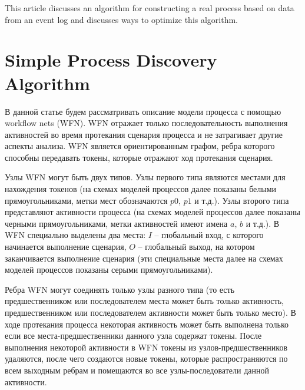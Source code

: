 \documentclass[
11pt,%
tightenlines,%
twoside,%
onecolumn,%
nofloats,%
nobibnotes,%
nofootinbib,%
superscriptaddress,%
noshowpacs,%
centertags]%
{revtex4}
\begin{document}
This article discusses an algorithm for constructing a real process based on data from an event log and discusses ways to optimize this algorithm.

\section{Simple Process Discovery Algorithm}

В данной статье будем рассматривать описание модели процесса с помощью workflow nets (WFN).
WFN отражает только последовательность выполнения активностей во время протекания сценария процесса и не затрагивает другие аспекты анализа.
WFN является ориентированным графом, ребра которого способны передавать токены, которые отражают ход протекания сценария.

Узлы WFN могут быть двух типов.
Узлы первого типа являются местами для нахождения токенов (на схемах моделей процессов далее показаны белыми прямоугольниками, метки мест обозначаются $p0$, $p1$ и т.д.).
Узлы второго типа представляют активности процесса (на схемах моделей процессов далее показаны черными прямоугольниками, метки активностей имеют имена $a$, $b$ и т.д.).
В WFN специально выделены два места: $I$ -- глобальный вход, с которого начинается выполнение сценария, $O$ -- глобальный выход, на котором заканчивается выполнение сценария (эти специальные места далее на схемах моделей процессов показаны серыми прямоугольниками).

Ребра WFN могут соединять только узлы разного типа (то есть предшественником или последователем места может быть только активность, предшественником или последователем активности может быть только место).
В ходе протекания процесса некоторая активность может быть выполнена только если все места-предшественники данного узла содержат токены.
После выполнения некоторой активности в WFN токены из узлов-предшественников удаляются, после чего создаются новые токены, которые распространяются по всем выходным ребрам и помещаются во все узлы-последователи данной активности.
\end{document}
